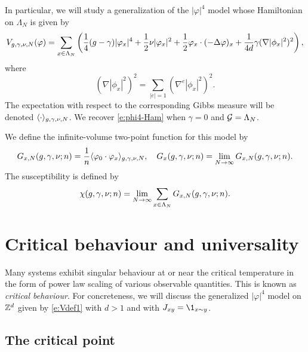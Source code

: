 In particular, we will study a generalization of the $|\varphi|^4$ model whose Hamiltonian
on $\Lambda_N$ is given by
\begin{equation}
\label{e:Vdef1}
V_{g,\gamma,\nu,N}(\varphi)
	=
\sum_{x\in\Lambda_N}
\left(
	\frac{1}{4} (g - \gamma) |\varphi_x|^4
		+
	\frac{1}{2} \nu |\varphi_x|^2
		+
	\frac{1}{2} \varphi_x \cdot (-\Delta \varphi)_x
		+
	\frac{1}{4 d} \gamma (\nabla |\phi_x|^2)^2
\right),
\end{equation}
where
\begin{equation}
(\nabla |\phi_x|^2)^2
	=
\sum_{|e|=1} (\nabla^e |\phi_x|^2)^2.
\end{equation}
The expectation with respect to the corresponding Gibbs measure will
be denoted $\langle\cdot\rangle_{g,\gamma,\nu,N}$.
We recover \eqref{e:phi4-Ham} when $\gamma = 0$ and $\mathcal{G} = \Lambda_N$.

We define the infinite-volume two-point function for this model by
\begin{equation}
\label{e:two-point-function-phi4}
G_{x, N}(g,\gamma,\nu; n)
	=
\frac{1}{n} \langle \varphi_0 \cdot \varphi_x \rangle_{g,\gamma,\nu,N},
	\quad
G_x(g,\gamma,\nu; n)
	=
\lim_{N \rightarrow \infty} G_{x, N}(g,\gamma,\nu; n).
\end{equation}
The susceptibility is defined by
\begin{equation}
\label{e:susceptibility-def}
\chi(g, \gamma, \nu; n)
	=
\lim_{N\rightarrow\infty} \sum_{x\in\Lambda_N} G_{x,N}(g, \gamma, \nu; n).
\end{equation}


\section{Critical behaviour and universality}
\label{sec:crit}

Many systems exhibit singular behaviour at or near the critical temperature in
the form of power law scaling of various observable quantities. This is known as
\emph{critical behaviour}. For concreteness, we will discuss the generalized
$|\varphi|^4$ model on ${ {{\mathbb Z}}^d }$ given by \eqref{e:Vdef1} with $d > 1$ and with $J_{xy} = \1_{x\sim y}$.


\subsection{The critical point}

